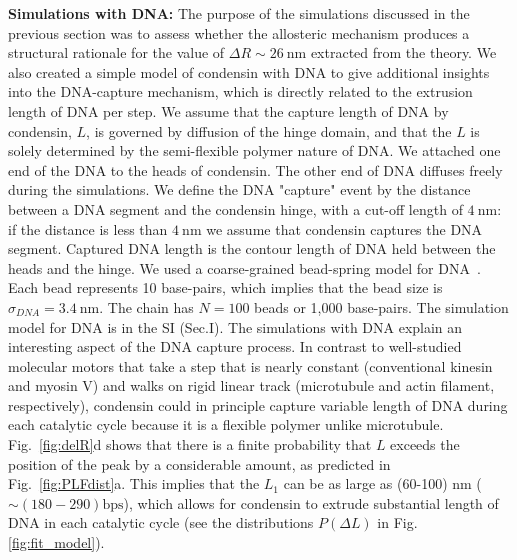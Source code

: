 \documentclass[fleqn,10pt]{wlscirep}
\newcommand{\nm}{\ \mathrm{nm}}
\newcommand{\vR}{R}
\newcommand{\vL}{L}
\newcommand{\DR}{\Delta {R}}
\begin{document}
{\bf Simulations with DNA:}
The purpose of the simulations discussed in the previous section was to assess whether the allosteric mechanism produces a structural rationale for the value of $\DR\sim 26\nm$ extracted from the theory.  We also created a simple model of condensin with DNA to give additional insights into the DNA-capture mechanism, which is directly related to the extrusion length of DNA per step. We assume that the capture length of DNA by condensin, $\vL$, is governed by  diffusion of the hinge domain, and that the $\vL$ is solely determined by the semi-flexible polymer nature of DNA.
We attached one end of the DNA to the heads of condensin. The other end of DNA diffuses freely during the simulations. We define the DNA "capture" event by the distance between a DNA segment and the condensin hinge, with a cut-off length of $4\nm$: if the distance is less than $4\nm$ we assume that condensin captures the DNA segment. Captured DNA length is the contour length of DNA held between the heads and the hinge. 
We used a coarse-grained bead-spring model for DNA~\cite{hyeon2006kinetics,dey2017toroidal}. Each bead represents 10 base-pairs, which implies that the bead size is $\sigma_{DNA}=3.4 \nm$. The chain has $N=100$ beads or 1,000 base-pairs. The simulation model for DNA is in the SI (Sec.I).
The simulations with DNA explain an interesting aspect of the DNA capture process. In contrast to well-studied molecular motors that take a step that is nearly constant (conventional kinesin and myosin V) and walks on rigid linear track (microtubule and actin filament, respectively), condensin could in principle capture variable length of DNA during each catalytic cycle because it is a flexible polymer unlike microtubule. 
 Fig.~\ref{fig:delR}d shows that there is a finite probability that $\vL$ exceeds the position of the peak by a considerable amount, as predicted in Fig.~\ref{fig:PLFdist}a. This implies that the $L_1$ can be as large as (60-100) nm ($\sim (180 - 290)  \mathrm{bps}$), which allows for condensin to extrude substantial length of DNA in each catalytic cycle (see the distributions $P(\Delta \vL)$ in Fig.\ref{fig:fit_model}). 
\end{document}
